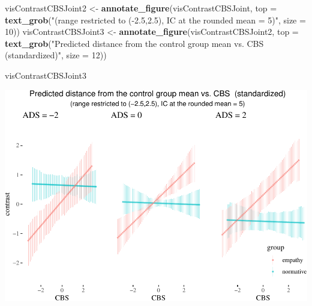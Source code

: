 \documentclass[10pt,dvipsnames,enabledeprecatedfontcommands]{scrartcl}
\newenvironment{Shaded}{\begin{snugshade}}{\end{snugshade}}
\newcommand{\KeywordTok}[1]{\textcolor[rgb]{0.13,0.29,0.53}{\textbf{#1}}}
\newcommand{\DataTypeTok}[1]{\textcolor[rgb]{0.13,0.29,0.53}{#1}}
\newcommand{\DecValTok}[1]{\textcolor[rgb]{0.00,0.00,0.81}{#1}}
\newcommand{\StringTok}[1]{\textcolor[rgb]{0.31,0.60,0.02}{#1}}
\newcommand{\NormalTok}[1]{#1}
\begin{document}
\begin{Shaded}
\begin{Highlighting}[]
\NormalTok{visContrastCBSJoint2 <-}\StringTok{ }\KeywordTok{annotate_figure}\NormalTok{(visContrastCBSJoint, }
      \DataTypeTok{top =} \KeywordTok{text_grob}\NormalTok{(}\StringTok{"(range restricted to (-2.5,2.5), IC at the rounded mean = 5)"}\NormalTok{,}
                                \DataTypeTok{size =} \DecValTok{10}\NormalTok{))}
\NormalTok{visContrastCBSJoint3 <-}\StringTok{ }\KeywordTok{annotate_figure}\NormalTok{(visContrastCBSJoint2, }
\DataTypeTok{top =} \KeywordTok{text_grob}\NormalTok{(}\StringTok{"Predicted distance from the control group mean vs. CBS  (standardized)"}\NormalTok{,}
                                \DataTypeTok{size =} \DecValTok{12}\NormalTok{))}

\NormalTok{visContrastCBSJoint3}
\end{Highlighting}
\end{Shaded}

\begin{center}\includegraphics[width=1\linewidth]{bayesianReport_files/figure-latex/unnamed-chunk-15-1} \end{center}

\normalsize

\vspace{1mm} \footnotesize
\end{document}
